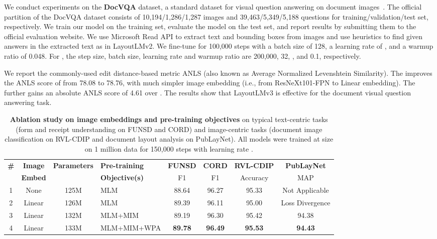 \documentclass[sigconf]{acmart}
\begin{document}
We conduct experiments on the \textbf{DocVQA} dataset, a standard dataset for visual question answering on document images~\cite{mathew2021docvqa}. 
The official partition of the DocVQA dataset consists of 10,194/1,286/1,287 images and 39,463/5,349/5,188 questions for training/validation/test set, respectively. We train our model on the training set, evaluate the model on the test set, and report results by submitting them to the official evaluation website.
We use Microsoft Read API to extract text and bounding boxes from images and use heuristics to find given answers in the extracted text as in LayoutLMv2.
We fine-tune  for 100,000 steps with a batch size of 128, a learning rate of , and a warmup ratio of 0.048.
For , the step size, batch size, learning rate and warmup ratio are 200,000, 32, , and 0.1, respectively.

We report the commonly-used edit distance-based metric ANLS (also known as Average Normalized Levenshtein Similarity).
The  improves the ANLS score of  from 78.08 to 78.76, with much simpler image embedding (i.e., from ResNeXt101-FPN to Linear embedding).
The  further gains an absolute ANLS score of 4.61 over .
The results show that LayoutLMv3 is effective for the document visual question answering task.



\begin{table*}[t]
    \centering
    \caption{\textbf{Ablation study on image embeddings and pre-training objectives} on typical text-centric tasks (form and receipt understanding on FUNSD and CORD) and image-centric tasks (document image classification on RVL-CDIP and document layout analysis on PubLayNet).
    All models were trained at  size on 1 million data for 150,000 steps with learning rate .
}
    \label{tab:ablation}
    \begin{tabular}{ccclcccc}
    \toprule
    \multirow{2}{*}{\bf \#} & \bf Image & \multirow{2}{*}{\bf Parameters} & \bf Pre-training & \bf FUNSD & \bf CORD & \bf RVL-CDIP  & \bf PubLayNet \\
     & \bf Embed & & \bf Objective(s) & F1 & F1 & Accuracy & MAP \\
    \midrule
    1 & None & 125M & MLM & {88.64} & {96.27} & 95.33 & Not Applicable \\
    2 & Linear & 126M & MLM & 89.39 & 96.11 & 95.00 & Loss Divergence \\
    3 & Linear & 132M & MLM+MIM  & 89.19 & 96.30 & {95.42}& {94.38} \\
    4 & Linear & 133M & MLM+MIM+WPA & \textbf{89.78} &  \textbf{96.49} & \textbf{95.53} & \textbf{94.43} \\
    \bottomrule
    \end{tabular}
\end{table*}
\end{document}

